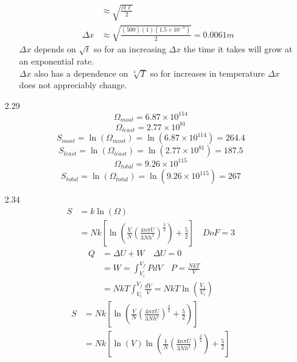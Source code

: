 \documentclass{article}
\begin{document}
\begin{enumerate}
\begin{enumerate}
\begin{align*}
                    &\approx \sqrt{\frac{\overline{v} t \ell}{2}} \\
                    \Delta x &\approx \sqrt{\frac{(500)(1)(1.5 \times 10^{-7})}{2}} = 0.0061 m
                \end{align*}
                \(\Delta x\) depends on \(\sqrt{t}\) so for an increasing \(\Delta x\) the time it takes will grow at an exponential rate. \\
                \(\Delta x\) also has a dependence on \(\sqrt[4]{T}\) so for increases in temperature \(\Delta x\) does not appreciably change.
        \end{enumerate}
    \vspace{0.1in}
    \item [2.29]
        \[\Omega_{most} = 6.87 \times 10^{114}\]
        \[\Omega_{least} = 2.77 \times 10^{81}\]
        \[S_{most} = \ln(\Omega_{most}) = \ln(6.87 \times 10^{114}) = 264.4\]
        \[S_{least} = \ln(\Omega_{least}) = \ln(2.77 \times 10^{81}) = 187.5\]
        \[\Omega_{total} = 9.26 \times 10^{115}\]
        \[S_{total} = \ln(\Omega_{total}) = \ln(9.26 \times 10^{115}) = 267\]
    \vspace{0.1in}
    \item [2.34]
        \begin{align*}
            S &= k\ln(\Omega) \\
            &= Nk\left[ \ln\left( \frac{V}{N} \left( \frac{4n \pi U}{3Nh^3} \right)^{\frac{3}{2}} \right) + \frac{5}{2} \right] \quad DoF = 3
        \end{align*}
        \begin{align*}
            Q &= \Delta U + W \quad \Delta U = 0 \\
            &= W = \int_{V_i}^{V_f} P dV \quad P = \frac{NkT}{V} \\
            &= NkT \int_{V_i}^{V_f} \frac{dV}{V} = NkT \ln\left( \frac{V_f}{V_i} \right)
        \end{align*}
        \begin{align*}
            S &= Nk\left[ \ln\left( \frac{V}{N} \left( \frac{4n \pi U}{3Nh^3} \right)^{\frac{3}{2}} + \frac{5}{2} \right) \right] \\
            &= Nk\left[ \ln(V) \ln\left( \frac{1}{N} \left( \frac{4n \pi U}{3Nh^3} \right)^{\frac{3}{2}} \right) + \frac{5}{2} \right]

\end{align*}
\end{enumerate}
\end{document}
